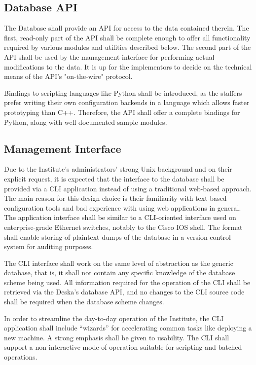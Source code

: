 \documentclass{article}
\begin{document}
\subsection{Database API}

The Database shall provide an API for access to the data contained therein. The first, read-only part of the API shall be complete
enough to offer all functionality required by various modules and utilities described below.  The second part of the API shall be
used by the management interface for performing actual modifications to the data.  It is up for the implementors to decide on the
technical means of the API's "on-the-wire" protocol.

Bindings to scripting languages like Python shall be introduced, as the staffers prefer writing their own configuration backends
in a language which allows faster prototyping than C++.  Therefore, the API shall offer a complete bindings for Python, along with
well documented sample modules.

\subsection{Management Interface}

Due to the Institute's administrators' strong Unix background and on their explicit request, it is expected that the interface to
the database shall be provided via a CLI application instead of using a traditional web-based approach.  The main reason for this
design choice is their familiarity with text-based configuration tools and bad experience with using web applications in general.  The
application interface shall be similar to a CLI-oriented interface used on enterprise-grade Ethernet switches, notably to the
Cisco IOS shell.  The format shall enable storing of plaintext dumps of the database in a version control system for auditing
purposes.

The CLI interface shall work on the same level of abstraction as the generic database, that is, it shall not contain any specific
knowledge of the database scheme being used.  All information required for the operation of the CLI shall be retrieved via the
Deska's database API, and no changes to the CLI source code shall be required when the database scheme changes.

In order to streamline the day-to-day operation of the Institute, the CLI application shall include ``wizards'' for accelerating
common tasks like deploying a new machine. A strong emphasis shall be given to usability. The CLI shall support a non-interactive
mode of operation suitable for scripting and batched operations.
\end{document}

